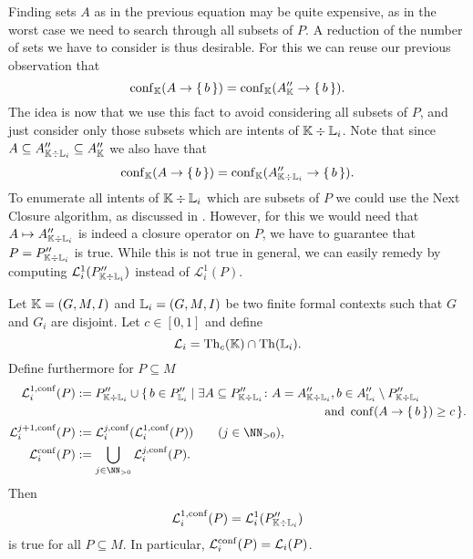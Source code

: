 Finding sets $A$ as in the previous equation may be quite expensive, as in the worst case
we need to search through all subsets of $P$.  A reduction of the number of sets we have
to consider is thus desirable.  For this we can reuse our previous observation that
\begin{equation*}
  \operatorname{conf}_{{\mathbb{K}}}(A \to {\ensuremath{\{\, b \,\}}}) = \operatorname{conf}_{{\mathbb{K}}}(A_{{\mathbb{K}}}'' \to {\ensuremath{\{\, b \,\}}}).
\end{equation*}
The idea is now that we use this fact to avoid considering all subsets of $P$, and just
consider only those subsets which are intents of ${\mathbb{K}} \div {\ensuremath{\mathbb{L}}}_{i}$.  Note that
since $A \subseteq A_{{\mathbb{K}} \div {\ensuremath{\mathbb{L}}}_{i}}'' \subseteq A_{{\mathbb{K}}}''$ we also have that
\begin{equation*}
  \operatorname{conf}_{{\mathbb{K}}}(A \to {\ensuremath{\{\, b \,\}}}) = \operatorname{conf}_{{\mathbb{K}}}(A_{{\mathbb{K}} \div {\ensuremath{\mathbb{L}}}_{i}}'' \to {\ensuremath{\{\,
    b \,\}}}).
\end{equation*}
To enumerate all intents of ${\mathbb{K}} \div {\ensuremath{\mathbb{L}}}_{i}$ which are subsets of $P$ we could use
the Next Closure algorithm, as discussed in .  However, for
this we would need that $A \mapsto A_{{\mathbb{K}} \div {\ensuremath{\mathbb{L}}}_{i}}''$ is indeed a closure
operator on $P$, \ie we have to guarantee that $P = P_{{\mathbb{K}} \div {\ensuremath{\mathbb{L}}}_{i}}''$ is
true.  While this is not true in general, we can easily remedy by computing
$\mathcal{L}_{i}^{1}(P_{{\mathbb{K}} \div {\ensuremath{\mathbb{L}}}_{i}}'')$ instead of $\mathcal{L}_{i}^{1}(P)$.

\begin{Proposition}
  \label{prop:computing-confident-closure-second-try}
  Let ${\mathbb{K}} = (G, M, I)$ and ${\mathbb{L}}_{i} = (G, M, I)$ be two finite formal contexts such
  that $G$ and $G_{i}$ are disjoint.  Let $c \in [0,1]$ and define
  \begin{equation*}
    \mathcal{L}_{i} = \operatorname{Th}_{c}({\mathbb{K}}) \cap \operatorname{Th}({\mathbb{L}}_{i}).
  \end{equation*}
  Define furthermore for $P \subseteq M$
  \begin{align*}
    \mathcal{L}_{i}^{1,\conf}(P) &:= P_{\con K \div \con L_{i}}'' \cup \{\, b \in P_{\con
      L_{i}}'' \mid \exists A \subseteq P_{\con K \div \con L_{i}}'' \st A = A_{\con K
      \div \con L_{i}}'', b \in A_{\con L_{i}}'' \setminus
    P_{\con K \div \con L_{i}}''\\ &\hspace*{20em} \text{ and } \conf(A \to \set{b}) \ge c
    \,\}.\\
    \mathcal{L}_{i}^{j+1,\conf}(P) &:=
    \mathcal{L}_{i}^{j,\conf}(\mathcal{L}_{i}^{1,\conf}(P)) \qquad (j \in \NN_{>0}),\\
    \mathcal{L}_{i}^{\conf}(P) &:= \bigcup_{j \in \NN_{>0}} \mathcal{L}_{i}^{j,\conf}(P).
  \end{align*}
  Then
  \begin{equation*}
    \mathcal{L}_{i}^{1,\operatorname{conf}}(P) = \mathcal{L}_{i}^{1}(P_{{\mathbb{K}} \div {\ensuremath{\mathbb{L}}}_{i}}'')
  \end{equation*}
  is true for all $P \subseteq M$.  In particular, $\mathcal{L}_{i}^{\operatorname{conf}}(P) =
  \mathcal{L}_{i}(P)$.
\end{Proposition}

